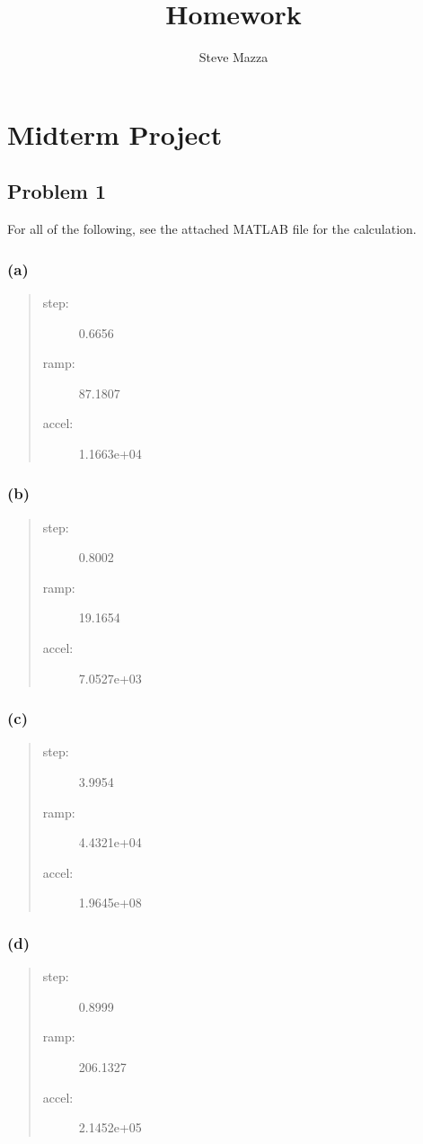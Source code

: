 \documentclass[letterpaper,10pt]{article}
\title{Homework}
\author{Steve Mazza}
\begin{document}
\maketitle

\section*{Midterm Project}
\subsection*{Problem 1}
For all of the following, see the attached MATLAB file for the calculation.
\subsubsection*{(a)}
\begin{quote}\begin{description}
	\item[step:] 0.6656
	\item[ramp:] 87.1807
	\item[accel:] 1.1663e+04
\end{description}\end{quote}
\subsubsection*{(b)}
\begin{quote}\begin{description}
	\item[step:] 0.8002
	\item[ramp:] 19.1654
	\item[accel:] 7.0527e+03
\end{description}\end{quote}
\subsubsection*{(c)}
\begin{quote}\begin{description}
	\item[step:] 3.9954
	\item[ramp:] 4.4321e+04
	\item[accel:] 1.9645e+08
\end{description}\end{quote}
\subsubsection*{(d)}
\begin{quote}\begin{description}
	\item[step:] 0.8999
	\item[ramp:] 206.1327
	\item[accel:] 2.1452e+05
\end{description}\end{quote}
\end{document}
